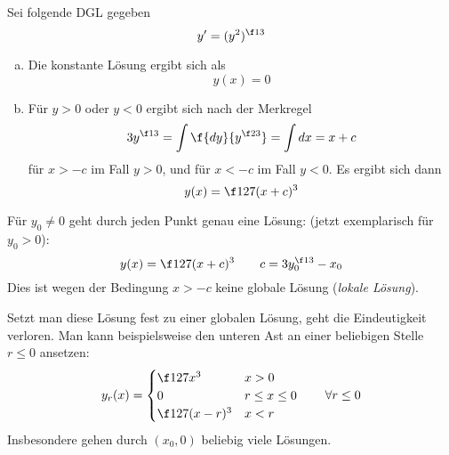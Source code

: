 \begin{ex} \label{2.3}
	Sei folgende DGL gegeben
	\[
		y' = (y^2)^{\f 13}
	\]
	\begin{enumerate}[a)]
		\item
			Die konstante Lösung ergibt sich als
			\[
				y(x) = 0
			\]
		\item
			Für $y > 0$ oder $y < 0$ ergibt sich nach der Merkregel
			\[
				3 y^{\f 13} = \int \f {dy}{y^{\f 23}} = \int  dx = x + c 
			\]
			für $x > -c$ im Fall $y > 0$, und für $x < -c$ im Fall $y < 0$.
			Es ergibt sich dann
			\[
				y(x) = \f 1{27}(x + c)^3
			\]
	\end{enumerate}
	\begin{note}[Beobachtungen]
		Für $y_0 \neq 0$ geht durch jeden Punkt genau eine Lösung:
		(jetzt exemplarisch für $y_0 > 0$):
		\[
			y(x) = \f 1{27}(x+c)^3  
			\qquad c = 3y_0^{\f 13} - x_0
		\]
		Dies ist wegen der Bedingung $x > -c$ keine globale Lösung (\emph{lokale Lösung}).

		Setzt man diese Lösung fest zu einer globalen Lösung, geht die Eindeutigkeit verloren.
		Man kann beispielsweise den unteren Ast an einer beliebigen Stelle $r \le 0$ ansetzen:
		\[
			y_r(x) = \begin{cases}
				\f 1{27} x^3  & x > 0 \\
				0 & r \le x \le 0 \\
				\f 1{27} (x-r)^3 & x < r
			\end{cases}
			\qquad \forall r \le 0
		\]
		Insbesondere gehen durch $(x_0, 0)$ beliebig viele Lösungen.
	\end{note}
\end{ex}
